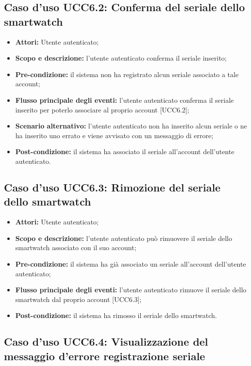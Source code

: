 \subsection{Caso d'uso UCC6.2: Conferma del seriale dello smartwatch}

\begin{itemize}
\item \textbf{Attori:} Utente autenticato;
\item \textbf{Scopo e descrizione:} l'utente autenticato conferma il seriale inserito;
\item \textbf{Pre-condizione:} il sistema non ha registrato alcun seriale associato a tale account;
\item \textbf{Flusso principale degli eventi:} l'utente autenticato conferma il seriale inserito per poterlo associare al proprio account [UCC6.2];
\item \textbf{Scenario alternativo:} l'utente autenticato non ha inserito alcun seriale o ne ha inserito uno errato e viene avvisato con un messaggio di errore;
\item \textbf{Post-condizione:} il sistema ha associato il seriale all'account dell'utente autenticato.
\end{itemize}

\subsection{Caso d'uso UCC6.3: Rimozione del seriale dello smartwatch}

\begin{itemize}
\item \textbf{Attori:} Utente autenticato;
\item \textbf{Scopo e descrizione:} l'utente autenticato può rimuovere il seriale dello smartwatch associato con il suo account;
\item \textbf{Pre-condizione:} il sistema ha già associato un seriale all'account dell'utente autenticato;
\item \textbf{Flusso principale degli eventi:} l'utente autenticato rimuove il seriale dello smartwatch dal proprio account [UCC6.3];
\item \textbf{Post-condizione:} il sistema ha rimosso il seriale dello smartwatch.
\end{itemize}

\subsection{Caso d'uso UCC6.4: Visualizzazione del messaggio d'errore registrazione seriale}

